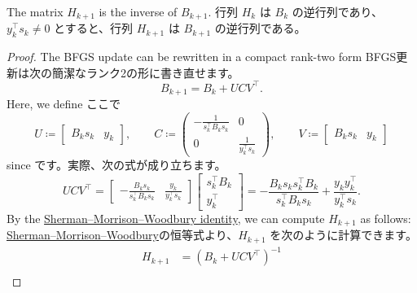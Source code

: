 \documentclass[0_main]{subfiles}
\begin{document}
\begin{proposition}
    \ifEn
        The matrix $H_{k+1}$ is the inverse of $B_{k+1}$.
    \else
        行列 $H_k$ は $B_k$ の逆行列であり、$y_k^\top s_k \neq 0$ とすると、行列 $H_{k+1}$ は $B_{k+1}$ の逆行列である。
    \fi
\end{proposition}
\begin{proof}
    \ifEn
        The BFGS update can be rewritten in a compact rank-two form
    \else
        BFGS更新は次の簡潔なランク2の形に書き直せます。
    \fi
    \begin{equation*}
        B_{k+1} = B_k + UCV^\top.
    \end{equation*}
    \ifEn
        Here, we define
    \else
        ここで
    \fi
    \begin{equation*}
        U \coloneqq \begin{bmatrix}B_k s_k & y_k\end{bmatrix},\qquad
        C \coloneqq \begin{pmatrix}-\frac{1}{s_k^\top B_k s_k} & 0 \\ 0 & \frac{1}{y_k^\top s_k}\end{pmatrix},\qquad
        V \coloneqq \begin{bmatrix}B_k s_k & y_k\end{bmatrix}
    \end{equation*}
    \ifEn
        since
    \else
        です。実際、次の式が成り立ちます。
    \fi
    \begin{equation*}
        U C V^\top   = \begin{bmatrix} -\frac{B_k s_k}{s_k^\top B_k s_k}&    \frac{y_k}{y_k^\top s_k} \end{bmatrix} \begin{bmatrix} s_k^\top B_k  \\  y_k^\top \end{bmatrix}
        = -\frac{B_k s_k s_k^\top B_k}{s_k^\top B_k s_k} + \frac{y_k y_k^\top}{y_k^\top s_k}.
    \end{equation*}
    \ifEn
        By the \href{https://en.wikipedia.org/wiki/Woodbury_matrix_identity}{Sherman--Morrison--Woodbury identity}, we can compute $H_{k+1}$ as follows:
    \else
        \href{https://en.wikipedia.org/wiki/Woodbury_matrix_identity}{Sherman--Morrison--Woodbury}の恒等式より、$H_{k+1}$ を次のように計算できます。
    \fi
    \begin{align*}
        H_{k+1} & = (B_k + U C V^\top)^{-1}                                                                                                                                                                                                                                                                                                                                                                                                                                                                                                                                                                                                                                                                      \\

\end{align*}
\end{proof}
\end{document}
